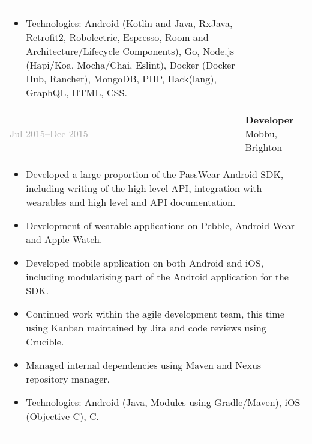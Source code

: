 \documentclass{article}
\newenvironment{exptable}{
  \begin{longtable}{lp{0.8\textwidth}}
  }{
  \end{longtable}
}
\begin{document}
\begin{exptable}
{        \begin{itemize}[leftmargin=1em]
          \item[] Technologies: Android (Kotlin and Java, RxJava, Retrofit2, Robolectric, Espresso, Room and Architecture/Lifecycle Components), Go, Node.js (Hapi/Koa, Mocha/Chai, Eslint), Docker (Docker Hub, Rancher), MongoDB, PHP, Hack(lang), GraphQL, HTML, CSS.
        \end{itemize}
      } \\
      \textcolor{darkgray}{Jul 2015--Dec 2015} & \textbf{Developer} Mobbu, Brighton \\
      \multicolumn{2}{p{\textwidth}}{
        \begin{itemize}
          \item Developed a large proportion of the PassWear Android SDK, including writing of the high-level API, integration with wearables and high level and API documentation.
          \item Development of wearable applications on Pebble, Android Wear and Apple Watch.
          \item Developed mobile application on both Android and iOS, including modularising part of the Android application for the SDK.
          \item Continued work within the agile development team, this time using Kanban maintained by Jira and code reviews using Crucible.
          \item Managed internal dependencies using Maven and Nexus repository manager.
        \end{itemize}

        \vspace{1em}

        \begin{itemize}[leftmargin=1em]
          \item[] Technologies: Android (Java, Modules using Gradle/Maven), iOS (Objective-C), C.
        \end{itemize}
      } \\

      \clearpage


\end{exptable}
\end{document}
